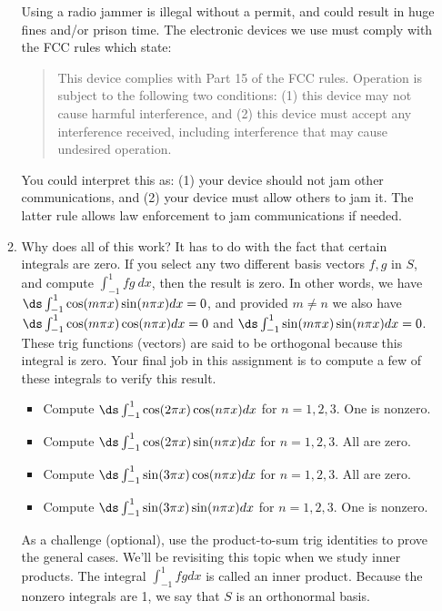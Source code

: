 \begin{enumerate}
\begin{enumerate}
Using a radio jammer is illegal without a permit, and could result in huge fines and/or prison time. The electronic devices we use must comply with the FCC rules which state:
\begin{quote}
This device complies with Part 15 of the FCC rules. Operation is subject to the following two conditions: (1) this device may not cause harmful interference, and (2) this device must accept any interference received, including interference that may cause undesired operation.
\end{quote} 
You could interpret this as: (1) your device should not jam other communications, and (2) your device must allow others to jam it.  The latter rule allows law enforcement to jam communications if needed.  

	\item Why does all of this work?  It has to do with the fact that certain integrals are zero.  If you select any two different basis vectors $f,g$ in $S$, and compute $\int_{-1}^1 fg\ dx$, then the result is zero. In other words, we have $\ds \int_{-1}^1 \cos(m\pi x)\sin(n \pi x) dx = 0$, and provided $m\neq n$ we also have $\ds \int_{-1}^1 \cos(m\pi x)\cos(n \pi x) dx = 0$ and $\ds \int_{-1}^1 \sin(m\pi x)\sin(n \pi x) dx = 0$. These trig functions (vectors) are said to be orthogonal because this integral is zero. Your final job in this assignment is to compute a few of these integrals to verify this result. \begin{itemize}
	\item Compute $\ds \int_{-1}^1 \cos(2\pi x)\cos(n \pi x) dx$ for $n=1,2,3$. One is nonzero.
	\item Compute $\ds \int_{-1}^1 \cos(2\pi x)\sin(n \pi x) dx$ for $n=1,2,3$. All are zero.
	\item Compute $\ds \int_{-1}^1 \sin(3\pi x)\cos(n \pi x) dx$ for $n=1,2,3$. All are zero.
	\item Compute $\ds \int_{-1}^1 \sin(3\pi x)\sin(n \pi x) dx$ for $n=1,2,3$. One is nonzero.
\end{itemize}
As a challenge (optional), use the product-to-sum trig identities to prove the general cases. 
We'll be revisiting this topic when we study inner products.  The integral $\int _{-1}^1 fg dx$ is called an inner product. Because the nonzero integrals are 1, we say that $S$ is an orthonormal basis.

\end{enumerate}


\end{enumerate}
